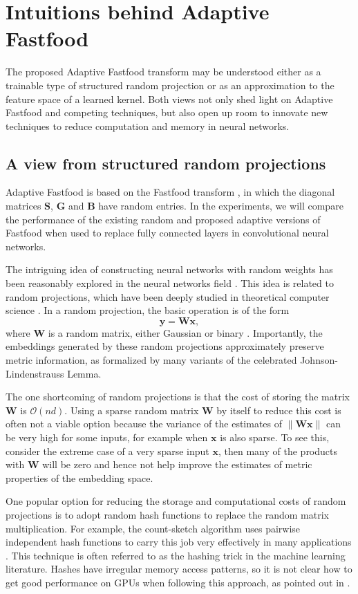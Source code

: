 \documentclass[10pt,twocolumn,letterpaper]{article}
\newcommand{\myvec}[1]{\mathbf{#1}}
\newcommand{\vx}{\myvec{x}}
\newcommand{\vy}{\myvec{y}}
\newcommand{\vB}{\myvec{B}}
\newcommand{\vG}{\myvec{G}}
\newcommand{\vS}{\myvec{S}}
\newcommand{\vW}{\myvec{W}}
\newcommand{\be}{\begin{equation}}
\newcommand{\ee}{\end{equation}}
\begin{document}
\section{Intuitions behind Adaptive Fastfood}
\label{sec:intuitions}

The proposed Adaptive Fastfood transform may be understood either as a trainable type of structured random projection or as an approximation to the feature space of a learned kernel. Both views not only shed light on Adaptive Fastfood and competing techniques, but also open up room to innovate new techniques to reduce computation and memory in neural networks.    

\subsection{A view from structured random projections}

Adaptive Fastfood is based on the Fastfood transform \cite{le:2013}, in which the diagonal matrices $\vS$, $\vG$ and  $\vB$ have random entries. In the experiments, we will compare the performance of the existing random and proposed adaptive versions of Fastfood when used to replace fully connected layers in convolutional neural networks. 

The intriguing idea of constructing neural networks with random weights has been reasonably explored in the neural networks field \cite{Saxe2011,Jaeger02042004}. This idea is related to random projections, which have been deeply studied in theoretical computer science \cite{Mitzenmacher2005}. In a random projection, the basic operation is of the form 
\be
\vy = \vW \vx,
\ee
where $\vW$ is a random matrix, either Gaussian \cite{Indyk1998} or binary \cite{Achlioptas2003}. Importantly, the embeddings generated by these random projections approximately preserve metric information, as formalized by many variants of the celebrated Johnson-Lindenstrauss Lemma. 

The one shortcoming of random projections is that the cost of storing the matrix $\vW$ is $\mathcal{O}(nd)$.  Using a sparse random matrix $\vW$ by itself to reduce this cost is often not a viable option because the variance of the estimates of $\|\vW\vx\|$ can be very high for some inputs, for example when $\vx$ is also sparse. To see this, consider the extreme case of a very sparse input $\vx$, then many of the products with $\vW$ will be zero and hence not help improve the estimates of metric properties of the embedding space.


One popular option for reducing the storage and computational costs of random projections is to adopt random hash functions to replace the random matrix multiplication. For example, the count-sketch algorithm \cite{Charikar2004} uses pairwise independent hash functions to carry this job very effectively in many applications \cite{Cormode2012}. This technique is often referred to as the hashing trick \cite{Weinberger2009} in the machine learning literature. 
Hashes have irregular memory access patterns, so it is not clear how to get good performance on GPUs when following this approach, as pointed out in \cite{Chen2015}.
\end{document}
